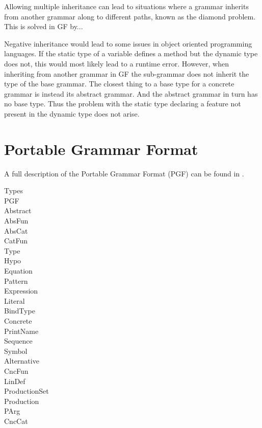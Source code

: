 Allowing multiple inheritance can lead to situations where a grammar inherits from another grammar along to different paths, known as the diamond problem. This is solved in GF by...

Negative inheritance would lead to some issues in object oriented programming languages. If the static type of a variable defines a method but the dynamic type does not, this would most likely lead to a runtime error. However, when inheriting from another grammar in GF the sub-grammar does not inherit the type of the base grammar. The closest thing to a base type for a concrete grammar is instead its abstract grammar. And the abstract grammar in turn has no base type. Thus the problem with the static type declaring a feature not present in the dynamic type does not arise.

\section{Portable Grammar Format}
\label{sec:pgf}
A full description of the Portable Grammar Format (PGF) can be found in \cite{Angelov}.

\begin{description}
\item[Types]
\item[PGF]
\item[Abstract]
\item[AbsFun]
\item[AbsCat]
\item[CatFun]
\item[Type]
\item[Hypo]
\item[Equation]
\item[Pattern]
\item[Expression]
\item[Literal]
\item[BindType]
\item[Concrete]
\item[PrintName]
\item[Sequence]
\item[Symbol]
\item[Alternative]
\item[CncFun]
\item[LinDef]
\item[ProductionSet]
\item[Production]
\item[PArg]
\item[CncCat]
\end{description}
